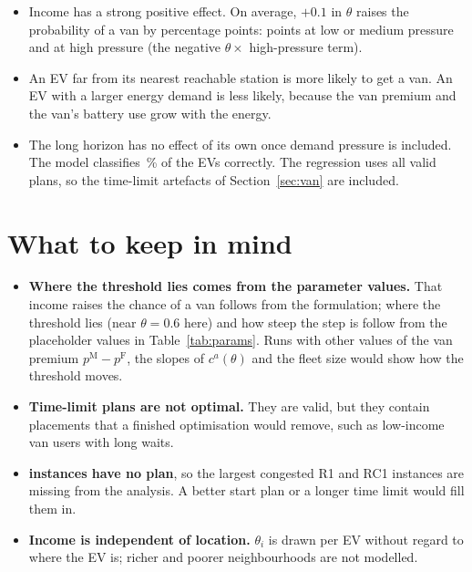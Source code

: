 \documentclass[11pt,a4paper]{article}
\newcommand{\pct}{\,\%}
\newcommand{\sect}[1]{\section{#1}}
\begin{document}
\begin{itemize}
  \item Income has a strong positive effect. On average, $+0.1$ in $\theta$ raises the probability of a van by \AME{} percentage points: \AMENotHigh{} points at low or medium pressure and \AMEHigh{} at high pressure (the negative $\theta\times$ high-pressure term).
  \item An EV far from its nearest reachable station is more likely to get a van. An EV with a larger energy demand is less likely, because the van premium and the van's battery use grow with the energy.
  \item The long horizon has no effect of its own once demand pressure is included. The model classifies \LogitAcc\pct{} of the EVs correctly. The regression uses all valid plans, so the time-limit artefacts of Section~\ref{sec:van} are included.
\end{itemize}

\begin{table}[H]
\centering\small
\caption{Logistic regression of $P(\text{served by a van})$.}
\label{tab:logit}

\end{table}

\sect{What to keep in mind}

\begin{itemize}
  \item \textbf{Where the threshold lies comes from the parameter values.} That income raises the chance of a van follows from the formulation; where the threshold lies (near $\theta=0.6$ here) and how steep the step is follow from the placeholder values in Table~\ref{tab:params}. Runs with other values of the van premium $p^{\mathrm M}-p^{\mathrm F}$, the slopes of $c^{a}(\theta)$ and the fleet size would show how the threshold moves.
  \item \textbf{Time-limit plans are not optimal.} They are valid, but they contain placements that a finished optimisation would remove, such as low-income van users with long waits.
  \item \textbf{\NNone{} instances have no plan}, so the largest congested R1 and RC1 instances are missing from the analysis. A better start plan or a longer time limit would fill them in.
  \item \textbf{Income is independent of location.} $\theta_i$ is drawn per EV without regard to where the EV is; richer and poorer neighbourhoods are not modelled.
\end{itemize}
\end{document}
